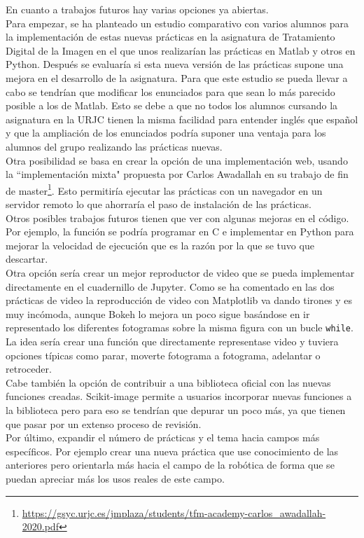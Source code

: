 En cuanto a trabajos futuros hay varias opciones ya abiertas.\\

Para empezar, se ha planteado un estudio comparativo con varios alumnos para la implementación de estas nuevas prácticas en la asignatura de Tratamiento Digital de la Imagen  en el que unos realizarían las prácticas en Matlab y otros en Python. Después se evaluaría si esta nueva versión de las prácticas supone una mejora en el desarrollo de la asignatura. Para que este estudio se pueda llevar a cabo se tendrían que modificar los enunciados para que sean lo más parecido posible a los de Matlab. Esto se debe a que no todos los alumnos cursando la asignatura en la URJC tienen la misma facilidad para entender inglés que español y que la ampliación de los enunciados podría suponer una ventaja para los alumnos del grupo realizando las prácticas nuevas.\\

Otra posibilidad se basa en crear la opción de una implementación web, usando la ``implementación mixta" propuesta por Carlos Awadallah en su trabajo de fin de master\footnote{\url{https://gsyc.urjc.es/jmplaza/students/tfm-academy-carlos_awadallah-2020.pdf}}. Esto permitiría ejecutar las prácticas con un navegador en un servidor remoto lo que ahorraría el paso de instalación de las prácticas.\\

Otros posibles trabajos futuros tienen que ver con algunas mejoras en el código. Por ejemplo, la función  se podría programar en C e implementar en Python para mejorar la velocidad de ejecución que es la razón por la que se tuvo que descartar.\\

Otra opción sería crear un mejor reproductor de video que se pueda implementar directamente en el cuadernillo de Jupyter. Como se ha comentado en las dos prácticas de video la reproducción de video con Matplotlib va dando tirones y es muy incómoda, aunque Bokeh lo mejora un poco sigue basándose en ir representado los diferentes fotogramas sobre la misma figura con un bucle \texttt{while}. La idea sería crear una función que directamente representase video y tuviera opciones típicas como parar, moverte fotograma a fotograma, adelantar o retroceder.\\

Cabe también la opción de contribuir a una biblioteca oficial con las nuevas funciones creadas. Scikit-image permite a usuarios incorporar nuevas funciones a la biblioteca pero para eso se tendrían que depurar un poco más, ya que tienen que pasar por un extenso proceso de revisión.\\

Por último, expandir el número de prácticas y el tema hacia campos más específicos. Por ejemplo crear una nueva práctica que use conocimiento de las anteriores pero orientarla más hacia el campo de la robótica de forma que se puedan apreciar más los usos reales de este campo.\\